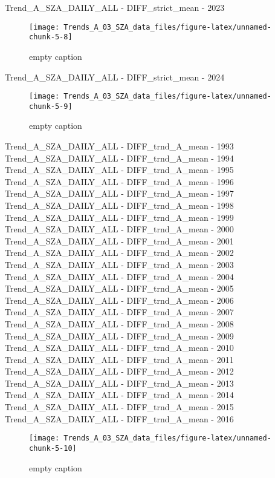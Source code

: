 \documentclass[
  10pt,
  a4paper,oneside]{article}
\begin{document}
Trend\_A\_SZA\_DAILY\_ALL - DIFF\_strict\_mean - 2023

\begin{figure}[!ht]

{\centering \texttt{[image: Trends\_A\_03\_SZA\_data\_files/figure-latex/unnamed-chunk-5-8]} 

}

\caption{ empty caption }\label{fig:unnamed-chunk-5-8}
\end{figure}

Trend\_A\_SZA\_DAILY\_ALL - DIFF\_strict\_mean - 2024

\begin{figure}[!ht]

{\centering \texttt{[image: Trends\_A\_03\_SZA\_data\_files/figure-latex/unnamed-chunk-5-9]} 

}

\caption{ empty caption }\label{fig:unnamed-chunk-5-9}
\end{figure}

Trend\_A\_SZA\_DAILY\_ALL - DIFF\_trnd\_A\_mean - 1993
Trend\_A\_SZA\_DAILY\_ALL - DIFF\_trnd\_A\_mean - 1994
Trend\_A\_SZA\_DAILY\_ALL - DIFF\_trnd\_A\_mean - 1995
Trend\_A\_SZA\_DAILY\_ALL - DIFF\_trnd\_A\_mean - 1996
Trend\_A\_SZA\_DAILY\_ALL - DIFF\_trnd\_A\_mean - 1997
Trend\_A\_SZA\_DAILY\_ALL - DIFF\_trnd\_A\_mean - 1998
Trend\_A\_SZA\_DAILY\_ALL - DIFF\_trnd\_A\_mean - 1999
Trend\_A\_SZA\_DAILY\_ALL - DIFF\_trnd\_A\_mean - 2000
Trend\_A\_SZA\_DAILY\_ALL - DIFF\_trnd\_A\_mean - 2001
Trend\_A\_SZA\_DAILY\_ALL - DIFF\_trnd\_A\_mean - 2002
Trend\_A\_SZA\_DAILY\_ALL - DIFF\_trnd\_A\_mean - 2003
Trend\_A\_SZA\_DAILY\_ALL - DIFF\_trnd\_A\_mean - 2004
Trend\_A\_SZA\_DAILY\_ALL - DIFF\_trnd\_A\_mean - 2005
Trend\_A\_SZA\_DAILY\_ALL - DIFF\_trnd\_A\_mean - 2006
Trend\_A\_SZA\_DAILY\_ALL - DIFF\_trnd\_A\_mean - 2007
Trend\_A\_SZA\_DAILY\_ALL - DIFF\_trnd\_A\_mean - 2008
Trend\_A\_SZA\_DAILY\_ALL - DIFF\_trnd\_A\_mean - 2009
Trend\_A\_SZA\_DAILY\_ALL - DIFF\_trnd\_A\_mean - 2010
Trend\_A\_SZA\_DAILY\_ALL - DIFF\_trnd\_A\_mean - 2011
Trend\_A\_SZA\_DAILY\_ALL - DIFF\_trnd\_A\_mean - 2012
Trend\_A\_SZA\_DAILY\_ALL - DIFF\_trnd\_A\_mean - 2013
Trend\_A\_SZA\_DAILY\_ALL - DIFF\_trnd\_A\_mean - 2014
Trend\_A\_SZA\_DAILY\_ALL - DIFF\_trnd\_A\_mean - 2015
Trend\_A\_SZA\_DAILY\_ALL - DIFF\_trnd\_A\_mean - 2016

\begin{figure}[!ht]

{\centering \texttt{[image: Trends\_A\_03\_SZA\_data\_files/figure-latex/unnamed-chunk-5-10]} 

}

\caption{ empty caption }\label{fig:unnamed-chunk-5-10}
\end{figure}
\end{document}
